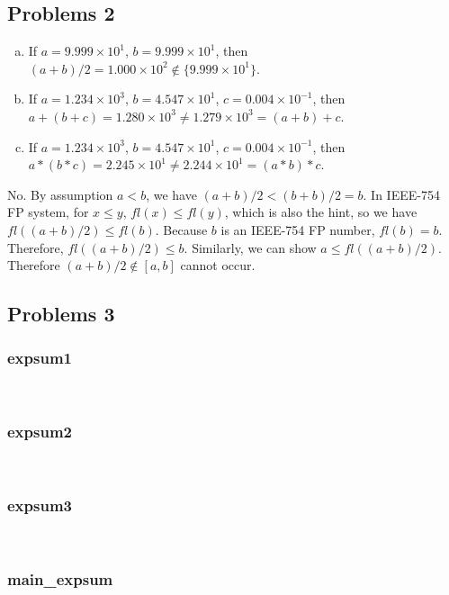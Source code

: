 \documentclass[11pt,fleqn]{exam}
\newcommand{\nn}{~\newline \noindent }
\begin{document}
	\subsection*{Problems 2}
	\begin{enumerate}[a.]
	\item If $a = 9.999 \times 10^1$, $b = 9.999 \times 10^1$, then $(a + b) / 2 = 1.000 \times 10^2 \not \in \{9.999\times10^1\}$.
	\item If $a = 1.234 \times 10^3$, $b = 4.547 \times 10^1$, $c = 0.004 \times 10^{-1}$, then $a + (b + c) = 1.280 \times 10^3 \neq 1.279 \times 10^3 = (a + b) + c$. 
	\item  If $a = 1.234 \times 10^3$, $b = 4.547 \times 10^1$, $c = 0.004 \times 10^{-1}$, then $a * (b * c) = 2.245 \times 10^1 \neq 2.244 \times 10^1 = (a * b) * c$. 
	\end{enumerate}
	

	\noindent No. By assumption $a < b$, we have $(a + b) / 2 < (b + b) / 2 = b$. In IEEE-754 FP system, for $x \leq y$, $fl(x) \leq fl(y)$, which is also the hint, so we have $fl( (a + b) / 2) \leq fl(b)$. Because $b$ is an IEEE-754 FP number, $fl(b) = b$. Therefore, $fl( (a + b) / 2) \leq b$. Similarly, we can show $a \leq fl( (a + b) / 2)$. Therefore $(a + b) / 2 \not \in [a, b]$ cannot occur.
	
	\subsection*{Problems 3}
	\subsubsection*{expsum1}
	
	
	\nn
	\subsubsection*{expsum2}
	
	
	\nn
	\subsubsection*{expsum3}
	
	
	\nn
	\subsubsection*{main\_expsum}
	
	
\end{document}
